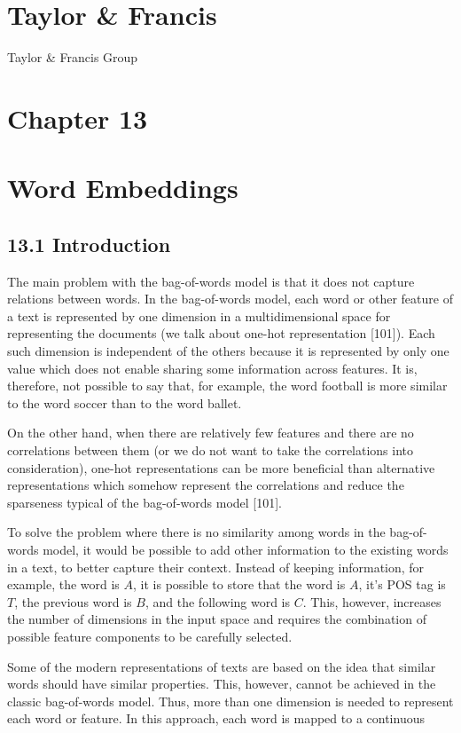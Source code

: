\documentclass[10pt]{book}
\begin{document}
\section*{Taylor \& Francis }
Taylor \& Francis Group



\section*{Chapter 13}
\section*{Word Embeddings}
\subsection*{13.1 Introduction}
The main problem with the bag-of-words model is that it does not capture relations between words. In the bag-of-words model, each word or other feature of a text is represented by one dimension in a multidimensional space for representing the documents (we talk about one-hot representation [101]). Each such dimension is independent of the others because it is represented by only one value which does not enable sharing some information across features. It is, therefore, not possible to say that, for example, the word football is more similar to the word soccer than to the word ballet.

On the other hand, when there are relatively few features and there are no correlations between them (or we do not want to take the correlations into consideration), one-hot representations can be more beneficial than alternative representations which somehow represent the correlations and reduce the sparseness typical of the bag-of-words model [101].

To solve the problem where there is no similarity among words in the bag-of-words model, it would be possible to add other information to the existing words in a text, to better capture their context. Instead of keeping information, for example, the word is $A$, it is possible to store that the word is $A$, it's POS tag is $T$, the previous word is $B$, and the following word is $C$. This, however, increases the number of dimensions in the input space and requires the combination of possible feature components to be carefully selected.

Some of the modern representations of texts are based on the idea that similar words should have similar properties. This, however, cannot be achieved in the classic bag-of-words model. Thus, more than one dimension is needed to represent each word or feature. In this approach, each word is mapped to a continuous
\end{document}
